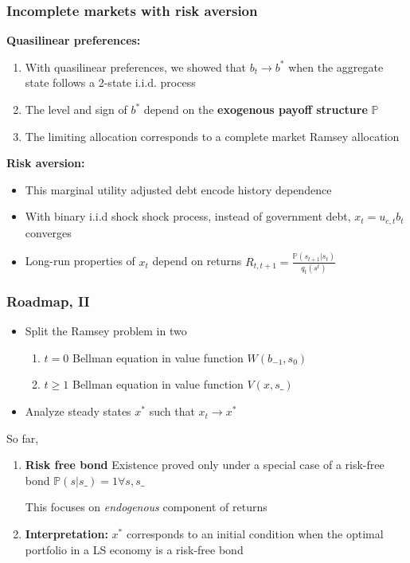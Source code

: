 \documentclass{beamer}
\begin{document}
\begin{frame}
 \frametitle{Incomplete markets with risk aversion}
 \textbf{Quasilinear preferences: }
 \begin{enumerate}
  \item With quasilinear preferences, we showed that $b_t\to b^*$ when the aggregate state follows a 2-state i.i.d. process
  \item The level  and sign of $b^*$ depend on the \textbf{exogenous payoff structure} $\mathbb{P}$
  \item The limiting allocation corresponds to a complete market Ramsey allocation
 \end{enumerate}

 \textbf{Risk aversion:}
  \begin{itemize}
   \item This marginal utility adjusted debt  encode history dependence
   \item  With binary i.i.d shock shock process, instead of government debt,  $x_t=u_{c,t}b_{t}$  converges

   \item Long-run properties of $x_t$ depend on returns $R_{t,t+1}=\frac{\mathbb{P}(s_{t+1}|s_t)}{q_t(s^t)}$

  \end{itemize}
  \end{frame}
%
\begin{frame}
\frametitle{Roadmap, II}
\begin{itemize}

\item Split the Ramsey problem in two
\begin{enumerate}
 \item  $t=0$ Bellman equation in value function $W(b_{-1},s_0)$ %
 \item  $t\geq 1$ Bellman equation in value function $V(x,s\_)$
\end{enumerate}

\item Analyze steady states $x^*$ such that $x_t \to x^*$

\end{itemize}
So far,
\begin{enumerate}
 \item \textbf{Risk free bond} Existence proved only under a special case of a risk-free bond  $\mathbb{P}(s|s\_)=1 \forall s,s\_$

 This focuses on \textit{endogenous} component of returns

 \item \textbf{Interpretation:}  $x^*$  corresponds to an initial condition when the optimal portfolio in a LS economy is a risk-free bond

\end{enumerate}

\end{frame}
\end{document}
